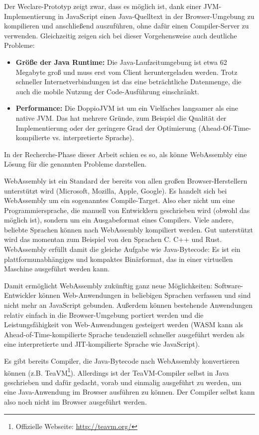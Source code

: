 Der Weclare-Prototyp zeigt zwar, dass es möglich ist, dank einer JVM-Implementierung in JavaScript einen Java-Quelltext in der Browser-Umgebung zu kompilieren und anschließend auszuführen, ohne dafür einen Compiler-Server zu verwenden. Gleichzeitig zeigen sich bei dieser Vorgehensweise auch deutliche Probleme:

\begin{itemize}
    \item \textbf{Größe der Java Runtime:} Die Java-Laufzeitumgebung ist etwa 62 Megabyte groß und muss erst vom Client heruntergeladen werden. Trotz schneller Internetverbindungen ist das eine beträchtliche Datenmenge, die auch die mobile Nutzung der Code-Ausführung einschränkt.
    \item \textbf{Performance:} Die DoppioJVM ist um ein Vielfaches langsamer als eine native JVM. Das hat mehrere Gründe, zum Beispiel die Qualität der Implementierung oder der geringere Grad der Optimierung (Ahead-Of-Time-kompilierte vs. interpretierte Sprache).
\end{itemize}

In der Recherche-Phase dieser Arbeit schien es so, als könne WebAssembly eine Lösung für die genannten Probleme darstellen.

WebAssembly ist ein Standard der bereits von allen großen Browser-Herstellern unterstützt wird (Microsoft, Mozilla, Apple, Google). Es handelt sich bei WebAssembly um ein sogenanntes Compile-Target. Also eher nicht um eine Programmiersprache, die manuell von Entwicklern geschrieben wird (obwohl das möglich ist), sondern um ein Ausgabeformat eines Compilers. Viele andere, beliebte Sprachen können nach WebAssembly kompiliert werden. Gut unterstützt wird das momentan zum Beispiel von den Sprachen C. C++ und Rust. WebAssembly erfüllt damit die gleiche Aufgabe wie Java-Bytecode: Es ist ein plattformunabhängiges und kompaktes Binärformat, das in einer virtuellen Maschine ausgeführt werden kann.

Damit ermöglicht WebAssembly zukünftig ganz neue Möglichkeiten: Software-Entwickler können Web-Anwendungen in beliebigen Sprachen verfassen und sind nicht mehr an JavaScript gebunden. Außerdem können bestehende Anwendungen relativ einfach in die Browser-Umgebung portiert werden und die Leistungsfähigkeit von Web-Anwendungen gesteigert werden (WASM kann als Ahead-of-Time-kompilierte Sprache tendenziell schneller ausgeführt werden als eine interpretierte und JIT-kompilierte Sprache wie JavaScript).

Es gibt bereits Compiler, die Java-Bytecode nach WebAssembly konvertieren können (z.B. TeaVM\footnote{Offizielle Webseite: \url{http://teavm.org/}}). Allerdings ist der TeaVM-Compiler selbst in Java geschrieben und dafür gedacht, vorab und einmalig ausgeführt zu werden, um eine Java-Anwendung im Browser ausführen zu können. Der Compiler selbst kann also noch nicht im Browser ausgeführt werden.

